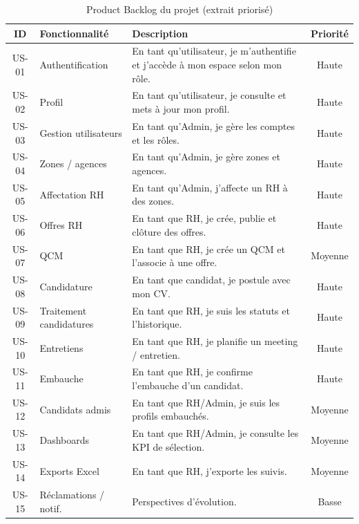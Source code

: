\begin{table}[htbp]
  \centering
  \small
  \caption{Product Backlog du projet (extrait priorisé)}
  \label{tab:product-backlog}
  \begin{tabular}{|c|p{3.4cm}|p{6.2cm}|c|}
    \hline
    \textbf{ID} & \textbf{Fonctionnalité} & \textbf{Description} & \textbf{Priorité} \\
    \hline
    US-01 & Authentification & En tant qu'utilisateur, je m'authentifie et j'accède à mon espace selon mon rôle. & Haute \\
    \hline
    US-02 & Profil & En tant qu'utilisateur, je consulte et mets à jour mon profil. & Haute \\
    \hline
    US-03 & Gestion utilisateurs & En tant qu'Admin, je gère les comptes et les rôles. & Haute \\
    \hline
    US-04 & Zones / agences & En tant qu'Admin, je gère zones et agences. & Haute \\
    \hline
    US-05 & Affectation RH & En tant qu'Admin, j'affecte un RH à des zones. & Haute \\
    \hline
    US-06 & Offres RH & En tant que RH, je crée, publie et clôture des offres. & Haute \\
    \hline
    US-07 & QCM & En tant que RH, je crée un QCM et l'associe à une offre. & Moyenne \\
    \hline
    US-08 & Candidature & En tant que candidat, je postule avec mon CV. & Haute \\
    \hline
    US-09 & Traitement candidatures & En tant que RH, je suis les statuts et l'historique. & Haute \\
    \hline
    US-10 & Entretiens & En tant que RH, je planifie un meeting / entretien. & Haute \\
    \hline
    US-11 & Embauche & En tant que RH, je confirme l'embauche d'un candidat. & Haute \\
    \hline
    US-12 & Candidats admis & En tant que RH/Admin, je suis les profils embauchés. & Moyenne \\
    \hline
    US-13 & Dashboards & En tant que RH/Admin, je consulte les KPI de sélection. & Moyenne \\
    \hline
    US-14 & Exports Excel & En tant que RH, j'exporte les suivis. & Moyenne \\
    \hline
    US-15 & Réclamations / notif. & Perspectives d'évolution. & Basse \\
    \hline
  \end{tabular}
\end{table}


